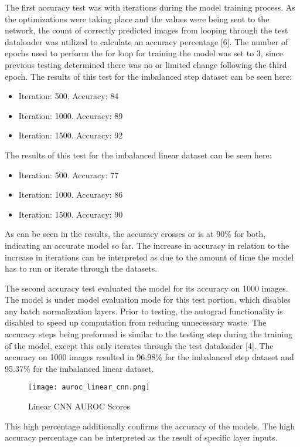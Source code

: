 \documentclass[conference]{IEEEtran}
\begin{document}
The first accuracy test was with iterations during the model training process. As the optimizations were taking place and the values were being sent to the network, the count of correctly predicted images from looping through the test dataloader was utilized to calculate an accuracy percentage [6]. The number of epochs used to perform the for loop for training the model was set to 3, since previous testing determined there was no or limited change following the third epoch. The results of this test for the imbalanced step dataset can be seen here:
\begin{itemize}
  \item Iteration: 500. Accuracy: 84
  \item Iteration: 1000. Accuracy: 89
  \item Iteration: 1500. Accuracy: 92
\end{itemize}
The results of this test for the imbalanced linear dataset can be seen here:
\begin{itemize}
  \item Iteration: 500. Accuracy: 77
  \item Iteration: 1000. Accuracy: 86
  \item Iteration: 1500. Accuracy: 90
\end{itemize}
As can be seen in the results, the accuracy crosses or is at 90\% for both, indicating an accurate model so far. The increase in accuracy in relation to the increase in iterations can be interpreted as due to the amount of time the model has to run or iterate through the datasets.

The second accuracy test evaluated the model for its accuracy on 1000 images. The model is under model evaluation mode for this test portion, which disables any batch normalization layers. Prior to testing, the autograd functionality is disabled to speed up computation from reducing unnecessary waste. The accuracy steps being preformed is similar to the testing step during the training of the model, except this only iterates through the test dataloader [4]. The accuracy on 1000 images resulted in 96.98\% for the imbalanced step dataset and 95.37\% for the imbalanced linear dataset. 
\begin{figure}[htbp]
\centerline{\texttt{[image: auroc\_linear\_cnn.png]}}
\caption{Linear CNN AUROC Scores}
\label{fig}
\end{figure}
This high percentage additionally confirms the accuracy of the models. The high accuracy percentage can be interpreted as the result of specific layer inputs. 
\end{document}
